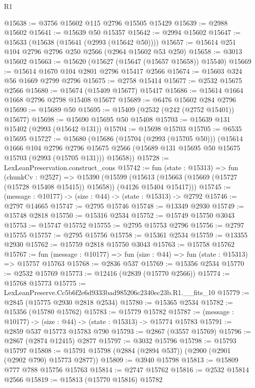 \begin{lexlean}{R1}
\begin{coremodule}
@15638 := @3756 @15602 @115 @2796 @15505 @15429
@15639 := @2988 @15602
@15641 := @15639 @50 @15357
@15642 := @2994 @15602
@15647 := @15633 (@15638 (@15641 (@2993 (@15642 @50))))
@15657 := @15614 @251 @104 @2796 @2796 @250 @2566 (@2964 @15602 @53 @250)
@15658 := @3013 @15602
@15663 := @15620 (@15627 (@15647 (@15657 @15658)) @15540)
@15669 := @15614 @1670 @104 @2801 @2796 @15417 @2566
@15674 := @15603 @324 @56 @1669 @2799 @2796
@15675 := @2758 @15414
@15677 := @2532 @15675 @2566
@15680 := @15674 (@15409 @15677) @15417
@15686 := @15614 @1664 @1668 @2796 @2798 @15408 @15677
@15689 := @6476 @15602 @284 @2796
@15690 := @15689 @50
@15695 := @15409 (@2532 (@242 (@2752 @15401)) @15677)
@15698 := @15690 @15695 @50 @15408
@15703 := @15639 @131 @15402 (@2993 (@15642 @131))
@15704 := @15698 @15703
@15705 := @6535 @15695
@15727 := @15680
    (@15686
      (@15704 (@2993 (@15705 @50)))
      (@15614
        @1666
        @104
        @2796
        @2796
        @15675
        @2566
        (@15689 @131 @15695 @50 @15675 @15703 (@2993 (@15705 @131)))
        @15658))
@15728 := LexLeanPreservation.construct_cons
@15742 := fun (state : @15313) =>
  fun (chunkCv : @2527) =>
  @15390
    (@15599 (@15613 (@15663 (@15669 (@15727 (@15728 @15408 @15415)) @15658)) (@4126 @15404 @15417)))
@15745 := (message : @10177) -> (size : @44) -> (state : @15313) -> @2792
@15746 := @2797 @14665
@15747 := @2795 @15746
@15748 := @13349 @2930
@15749 := @15748 @2818
@15750 := @15316 @2534
@15752 := @15749 @15750 @3043
@15753 := @15747 @15752
@15755 := @2795 @15753 @2796
@15756 := @2797 @15755
@15757 := @2795 @15756
@15758 := @15361 @2534
@15759 := @13355 @2930
@15762 := @15759 @2818 @15750 @3043
@15763 := @15758 @15762
@15767 := fun (message : @10177) => fun (size : @44) => fun (state : @15313) => @15757 @15763
@15768 := @2836 @537
@15769 := @15356 @2534
@15770 := @2532 @15769
@15773 := @12416 (@2839 (@15770 @2566))
@15774 := @15768 @15773
@15775 := LexLeanPreserve.Cc5b6f2e6d9333bad985206c2340ec23b.R1.__fits_10
@15779 := @2845 (@15775 @2930 @2818 @2534)
@15780 := @15365 @2534
@15782 := @15356 (@15780 @15762)
@15783 := @15779 @15782
@15787 := (message : @10177) -> (size : @44) -> (state : @15313) -> @15774 @15783
@15791 := @2859 @537 @15773 @15783 @790
@15793 := @2867 (@3557 @15769)
@15796 := @2867 (@2874 @12415) @2877
@15797 := @3032 @15796
@15798 := @15793 @15797
@15808 := @15791 @15798 (@2884 (@2894 @537)) (@2900 (@2901 (@2902 @790) @15773 @2877))
@15809 := @3940 @15798
@15813 := @15809 @777 @788 @15756 @15763
@15814 := @2747 @15762
@15816 := @2532 @15814 @2566
@15819 := @15813 (@15770 @15816) @15782

\end{coremodule}
\end{lexlean}
